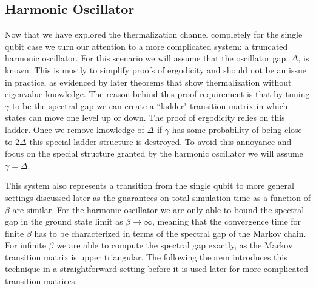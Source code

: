 \subsection{Harmonic Oscillator} \label{sec:harmonic_oscillator}
Now that we have explored the thermalization channel completely for the single qubit case we turn our attention to a more complicated system: a truncated harmonic oscillator. For this scenario we will assume that the oscillator gap, $\Delta$, is known. This is mostly to simplify proofs of ergodicity and should not be an issue in practice, as evidenced by later theorems that show thermalization without eigenvalue knowledge. The reason behind this proof requirement is that by tuning $\gamma$ to be the spectral gap we can create a ``ladder" transition matrix in which states can move one level up or down. The proof of ergodicity relies on this ladder. Once we remove knowledge of $\Delta$ if $\gamma$ has some probability of being close to $2 \Delta$ this special ladder structure is destroyed. To avoid this annoyance and focus on the special structure granted by the harmonic oscillator we will assume $\gamma = \Delta$.

This system also represents a transition from the single qubit to more general settings discussed later as the guarantees on total simulation time as a function of $\beta$ are similar. For the harmonic oscillator we are only able to bound the spectral gap in the ground state limit as $\beta \to \infty$, meaning that the convergence time for finite $\beta$ has to be characterized in terms of the spectral gap of the Markov chain. For infinite $\beta$ we are able to compute the spectral gap exactly, as the Markov transition matrix is upper triangular. The following theorem introduces this technique in a straightforward setting before it is used later for more complicated transition matrices. 

